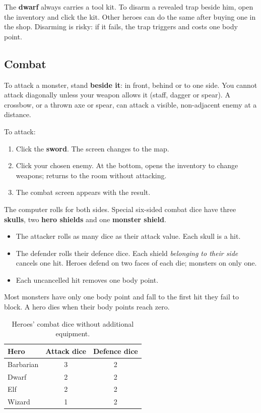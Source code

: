 The \textbf{dwarf} always carries a tool kit. To disarm a revealed trap beside him, open the inventory and click the kit. Other heroes can do the same after buying one in the shop. Disarming is risky: if it fails, the trap triggers and costs one body point.
\subsection{Combat}
To attack a monster, stand \textbf{beside it}: in front, behind or to one side. You cannot attack diagonally unless your weapon allows it (staff, dagger or spear). A crossbow, or a thrown axe or spear, can attack a visible, non-adjacent enemy at a distance.

To attack:
\begin{enumerate}
\item Click the \textbf{sword}. The screen changes to the map.
\item Click your chosen enemy. At the bottom,  opens the inventory to change weapons;  returns to the room without attacking.
\item The combat screen appears with the result.
\end{enumerate}
The computer rolls for both sides. Special six-sided combat dice have three \textbf{skulls}, two \textbf{hero shields} and one \textbf{monster shield}.
\begin{itemize}
\item The attacker rolls as many dice as their attack value. Each skull is a hit.
\item The defender rolls their defence dice. Each shield \emph{belonging to their side} cancels one hit. Heroes defend on two faces of each die; monsters on only one.
\item Each uncancelled hit removes one body point.
\end{itemize}
Most monsters have only one body point and fall to the first hit they fail to block. A hero dies when their body points reach zero.
\begin{table}[H]\centering\small
\begin{tabular}{@{}lcc@{}}
\toprule\textbf{Hero} & \textbf{Attack dice} & \textbf{Defence dice}\\\midrule
Barbarian &3&2\\ Dwarf &2&2\\ Elf &2&2\\ Wizard &1&2\\\bottomrule
\end{tabular}\caption{Heroes' combat dice without additional equipment.}\end{table}
